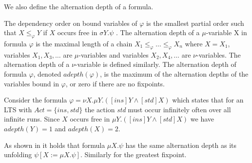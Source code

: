 We also define the alternation depth of a formula.
\begin{definition}
	The dependency order on bound variables of $\varphi$	is the smallest partial order such that $X \leq_\varphi Y$ if $X$ occurs free in $\sigma Y. \psi$ . The alternation depth of a $\mu$-variable X in formula $\varphi $ is the maximal length of a chain $X_1 \leq_\varphi  \dots \leq_\varphi X_n$ where $X = X_1$, variables $X_1, X_3, \dots$ are $\mu$-variables and variables $X_2, X_4, \dots$ are $\nu$-variables. The alternation depth of a $\nu$-variable is defined similarly. The alternation depth of formula $\varphi$, denoted $adepth(\varphi)$, is the maximum of the alternation depths of the variables bound in $\varphi$, or zero if there are no fixpoints.
\end{definition}
\begin{example}
	Consider the formula $\varphi = \nu X. \mu Y. ([ins]Y \wedge [std] X)$ which states that for an LTS with $Act = \{ ins, std\}$ the action \textit{std} must occur infinitely often over all infinite runs. Since $X$ occurs free in $\mu Y. ([ins] Y \wedge [std]X)$ we have $adepth(Y) = 1$ and $adepth(X) = 2$.
\end{example}
As shown in \cite{Bradfield2018} it holds that formula $\mu X. \psi$ has the same alternation depth as its unfolding $\psi[X:=\mu X. \psi]$. Similarly for the greatest fixpoint. 

